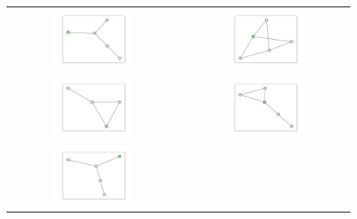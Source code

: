 \documentclass[12pt, a4paper]{extarticle}
\begin{document}
\begin{figure}\centering\begin{tabularx}{\textwidth}{cc}
\includegraphics[width=0.5\textwidth]{task11-graphlets/5_16-17-25-23-26.pdf} &
\includegraphics[width=0.5\textwidth]{task11-graphlets/5_21-18-22-23-24.pdf} \\
\includegraphics[width=0.5\textwidth]{task11-graphlets/4_21-25-23-26.pdf} &
\includegraphics[width=0.5\textwidth]{task11-graphlets/5_18-25-19-23-24.pdf} \\
\includegraphics[width=0.5\textwidth]{task11-graphlets/5_14-13-21-22-23.pdf} &

\end{tabularx}
\end{figure}
\end{document}
